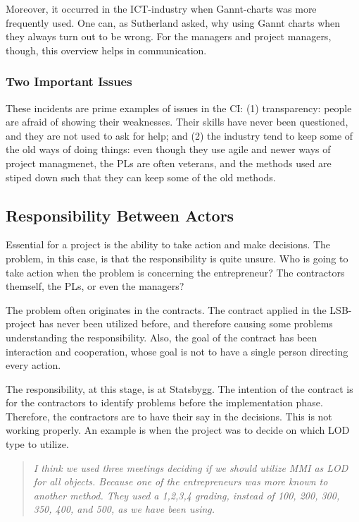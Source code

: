 Moreover, it occurred in the ICT-industry when Gannt-charts was more frequently used. One can, as Sutherland asked, why using Gannt charts when they always turn out to be wrong. For the managers and project managers, though, this overview helps in communication.

\subsubsection{Two Important Issues}
These incidents are prime examples of issues in the CI: (1) transparency: people are afraid of showing their weaknesses. Their skills have never been questioned, and they are not used to ask for help; and (2) the industry tend to keep some of the old ways of doing things: even though they use agile and newer ways of project managmenet, the PLs are often veterans, and the methods used are stiped down such that they can keep some of the old methods.

\subsection{Responsibility Between Actors}
Essential for a project is the ability to take action and make decisions. The problem, in this case, is that the responsibility is quite unsure. Who is going to take action when the problem is concerning the entrepreneur? The contractors themself, the PLs, or even the managers? 

The problem often originates in the contracts. The contract applied in the LSB-project has never been utilized before, and therefore causing some problems understanding the responsibility. Also, the goal of the contract has been interaction and cooperation, whose goal is not to have a single person directing every action. 

The responsibility, at this stage, is at Statsbygg. The intention of the contract is for the contractors to identify problems before the implementation phase. Therefore, the contractors are to have their say in the decisions. This is not working properly. An example is when the project was to decide on which LOD type to utilize.
\begin{quote}
    \textit{I think we used three meetings deciding if we should utilize MMI as LOD for all objects. Because one of the entrepreneurs was more known to another method. They used a 1,2,3,4 grading, instead of 100, 200, 300, 350, 400, and 500, as we have been using.}
\end{quote}


